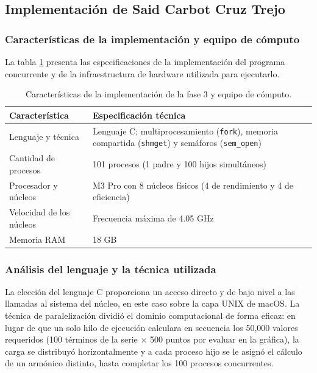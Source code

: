 \subsection{Implementación de Said Carbot Cruz Trejo}
\label{sec:cap03:said:implementacion}

\subsubsection{Características de la implementación y equipo de cómputo}
\label{sec:cap03:said:caracteristicas}

La tabla \ref{tab:cap03:said:caracteristicas} presenta las especificaciones de la implementación del programa concurrente y de la infraestructura de hardware utilizada para ejecutarlo.

\begin{table}[H]
    \centering
    \caption{Características de la implementación de la fase 3 y equipo de cómputo.}
    \label{tab:cap03:said:caracteristicas}
    \begin{tabular}{p{}p{}}
        \toprule
        \textbf{Característica} & \textbf{Especificación técnica} \\
        \midrule
        Lenguaje y técnica & Lenguaje C; multiprocesamiento (\texttt{fork}), memoria compartida (\texttt{shmget}) y semáforos (\texttt{sem\_open}) \\
        Cantidad de procesos & 101 procesos (1 padre y 100 hijos simultáneos) \\
        Procesador y núcleos & M3 Pro con 8 núcleos físicos (4 de rendimiento y 4 de eficiencia) \\
        Velocidad de los núcleos & Frecuencia máxima de 4.05 GHz \\
        Memoria RAM & 18 GB \\
        \bottomrule
    \end{tabular}
\end{table}

\subsubsection{Análisis del lenguaje y la técnica utilizada}
\label{sec:cap03:said:tecnica}

La elección del lenguaje C proporciona un acceso directo y de bajo nivel a las llamadas al sistema del núcleo, en este caso sobre la capa UNIX de macOS. La técnica de paralelización dividió el dominio computacional de forma eficaz: en lugar de que un solo hilo de ejecución calculara en secuencia los 50,000 valores requeridos (100 términos de la serie $\times$ 500 puntos por evaluar en la gráfica), la carga se distribuyó horizontalmente y a cada proceso hijo se le asignó el cálculo de un armónico distinto, hasta completar los 100 procesos concurrentes.

